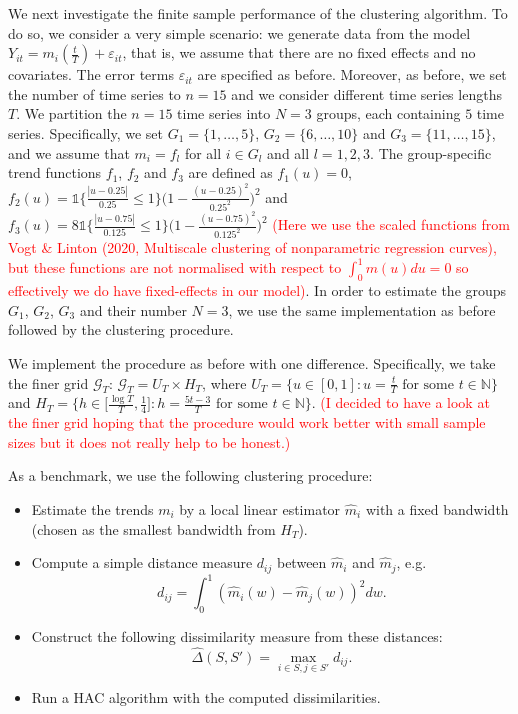 \documentclass[a4paper,12pt]{article}
\newcommand{\ind}{\mathbb{1}}
\begin{document}
We next investigate the finite sample performance of the clustering algorithm.%
To do so, we consider a very simple scenario: we generate data from the model $Y_{it} = m_i(\frac{t}{T}) + \varepsilon_{it}$, that is, we assume that there are no fixed effects and no covariates. The error terms $\varepsilon_{it}$ are specified as before. Moreover, as before, we set the number of time series to $n = 15$ and we consider different time series lengths $T$. We partition the $n = 15$ time series into $N=3$ groups, each containing $5$ time series. Specifically, we set $G_1 = \{1,\ldots, 5\}$, $G_2 = \{6,\ldots, 10\}$ and $G_3 =  \{11,\ldots, 15\}$, and we assume that $m_i = f_l$ for all $i \in G_l$ and all $l = 1, 2, 3$. The group-specific trend functions $f_1$, $f_2$ and $f_3$ are defined as $f_1(u) = 0$, $f_2(u) = \ind\Big\{\frac{|u - 0.25|}{0.25}\leq 1\Big\} \big(1 - \frac{(u - 0.25)^2}{0.25^2}\big)^2$ and $f_3(u) = 8 \ind\Big\{\frac{|u - 0.75|}{0.125}\leq 1\Big\} \big(1 - \frac{(u - 0.75)^2}{0.125^2}\big)^2$ \textcolor{red}{(Here we use the scaled functions from Vogt \& Linton (2020, Multiscale clustering of nonparametric regression curves), but these functions are not normalised with respect to $\int_0^1 m(u)du =0$ so effectively we do have fixed-effects in our model)}. In order to estimate the groups $G_1$, $G_2$, $G_3$ and their number $N = 3$, we use the same implementation as before followed by the clustering procedure.%

We implement the procedure as before with one difference. Specifically, we take the finer grid $\mathcal{G}_T$: $\mathcal{G}_T = U_T \times H_T$, where $U_T = \big\{ u \in [0,1]: u = \textstyle{\frac{t}{T}} \text{ for some } t \in \mathbb{N} \big\}$ and $H_T = \big\{ h \in \big[ \textstyle{\frac{\log T}{T}}, \textstyle{\frac{1}{4}} \big]:  h = \textstyle{\frac{5t - 3}{T}} \text{ for some } t \in \mathbb{N} \big\}$. \textcolor{red}{(I decided to have a look at the finer grid hoping that the procedure would work better with small sample sizes but it does not really help to be honest.)}

As a benchmark, we use the following clustering procedure:
\begin{itemize}[label=--,leftmargin=0.45cm,itemsep=0pt,topsep=0pt]
\item Estimate the trends $m_i$ by a local linear estimator $\hat{m}_i$ with a fixed bandwidth (chosen as the smallest bandwidth from $H_T$).
\item Compute a simple distance measure $d_{ij}$ between $\hat{m}_i$ and $\hat{m}_j$, e.g.
\[ d_{ij} = \int_0^1 (\hat{m}_i(w) - \hat{m}_j(w))^2 dw. \]
\item Construct the following dissimilarity measure from these distances:
\[ \hat{\Delta}(S,S') = \max_{i \in S,j \in S'} d_{ij}. \]
\item Run a HAC algorithm with the computed dissimilarities. 
\end{itemize}
\end{document}
